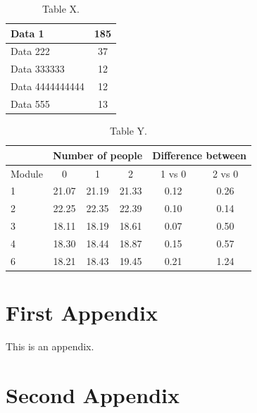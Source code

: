 \documentclass{article} %
\begin{document}
\begin{table}[H]
    \centering
    \begin{tabular}{||l | c ||}
        \hline\hline
        Data 1 & 185\\
        \hline
        Data 222 & 37\\
        \hline
        Data 333333 & 12\\
        \hline
        Data 4444444444 & 12\\
        \hline
        Data 555 & 13\\
        \hline\hline
    \end{tabular}
    \caption{Table X.}
    \label{tab:table-x}
\end{table}

\begin{table}[H]
    \centering
    \begin{tabular}{||l || c | c | c | c | c ||}
        \hline\hline
        & \multicolumn{3}{c|}{Number of people} & \multicolumn{2}{c||}{Difference between}\\
        \hline
        Module & 0 & 1 & 2 & 1 vs 0 & 2 vs 0\\
        \hline\hline
        1 & 21.07 & 21.19 & 21.33 & 0.12 & 0.26\\
        \hline
        2 & 22.25 & 22.35 & 22.39 & 0.10 & 0.14\\
        \hline
        3 & 18.11 & 18.19 & 18.61 & 0.07 & 0.50\\
        \hline
        4 & 18.30 & 18.44 & 18.87 & 0.15 & 0.57\\
        \hline
        6 & 18.21 & 18.43 & 19.45 & 0.21 & 1.24\\
        \hline\hline
    \end{tabular}
    \caption{Table Y.}
    \label{tab:table-y}
\end{table}

\clearpage

\appendix
\appendixpage
\addappheadtotoc

\section{First Appendix}\label{app:one}

This is an appendix.

\clearpage

\section{Second Appendix}\label{app:two}
\end{document}

